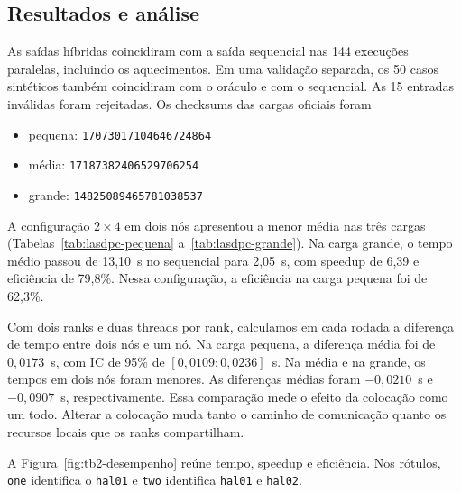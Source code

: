 \subsection{Resultados e análise}

As saídas híbridas coincidiram com a saída sequencial nas 144
execuções paralelas, incluindo os aquecimentos. Em uma validação separada, os 50 casos sintéticos também coincidiram
com o oráculo e com o sequencial. As 15 entradas inválidas foram
rejeitadas. Os checksums das cargas oficiais foram
\begin{itemize}
  \item pequena: \texttt{17073017104646724864}
  \item média: \texttt{17187382406529706254}
  \item grande: \texttt{14825089465781038537}
\end{itemize}

A configuração $2\times4$ em dois nós apresentou a menor média nas
três cargas (Tabelas~\ref{tab:lasdpc-pequena} a~\ref{tab:lasdpc-grande}).
Na carga grande, o tempo médio passou de 13,10~s no sequencial para
2,05~s, com speedup de 6,39 e eficiência de 79,8\%. Nessa
configuração, a eficiência na carga pequena foi de 62,3\%.

Com dois ranks e duas threads por rank, calculamos em cada rodada a
diferença de tempo entre dois nós e um nó. Na carga pequena, a
diferença média foi de $0{,}0173$~s, com IC de 95\% de
$[0{,}0109; 0{,}0236]$~s. Na média e na grande, os tempos em dois
nós foram menores. As diferenças médias foram $-0{,}0210$~s
e $-0{,}0907$~s, respectivamente. Essa comparação mede o efeito
da colocação como um todo. Alterar a colocação muda tanto o caminho
de comunicação quanto os recursos locais que os ranks compartilham.

A Figura~\ref{fig:tb2-desempenho} reúne tempo, speedup e eficiência.
Nos rótulos, \texttt{one} identifica o \texttt{hal01} e
\texttt{two} identifica \texttt{hal01} e \texttt{hal02}.
